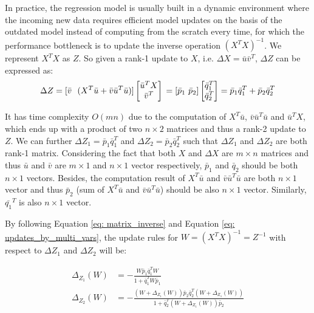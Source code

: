 In practice, the regression model is usually built in a dynamic environment where the incoming new data requires efficient model updates on the basis of the outdated model instead of computing from the scratch every time, for which the performance bottleneck is to update the inverse operation $(X^TX)^{-1}$. We represent $X^TX$ as $Z$. So given a rank-1 update to $X$, i.e. $\Delta X = \bar{u}\bar{v}^T$, $\Delta Z$ can be expressed as:
\begin{equation}
    \Delta Z = [\bar{v}\ \ (X^T\bar{u} + \bar{v}\bar{u}^T\bar{u})]\begin{bmatrix}
    \bar{u}^T X  \\
    \bar{v}^T  
\end{bmatrix}\\
=[\bar{p}_1\ \bar{p}_2]\begin{bmatrix}
    \bar{q}^T_1  \\
    \bar{q}^T_2  
\end{bmatrix}=\bar{p}_1\bar{q}_1^T + \bar{p}_2\bar{q}_2^T
\end{equation}

It has time complexity $O(mn)$ due to the computation of $X^T\bar{u}$, $\bar{v}\bar{u}^T\bar{u}$ and $\bar{u}^TX$, which ends up with a product of two $n\times 2$ matrices and thus a rank-2 update to $Z$. We can further $\Delta Z_1 = \bar{p}_1\bar{q}_1^T$ and $\Delta Z_2 = \bar{p}_2\bar{q}_2^T$ such that $\Delta Z_1$ and $\Delta Z_2$ are both rank-1 matrix. Considering the fact that both $X$ and $\Delta X$ are $m \times n$ matrices and thus $\bar{u}$ and $\bar{v}$ are $m \times 1$ and $n \times 1$ vector respectively, $\bar{p}_1$ and $\bar{q}_2$ should be both $n \times 1$ vectors. Besides, the computation result of $X^T\bar{u}$ and $\bar{v}\bar{u}^T\bar{u}$ are both $n \times 1$ vector and thus $\bar{p}_2$ (sum of $X^T\bar{u}$ and $\bar{v}\bar{u}^T\bar{u}$) should be also $n \times 1$ vector. Similarly, $\bar{q_1}^T$ is also $n \times 1$ vector.

By following Equation \ref{eq: matrix_inverse} and Equation \ref{eq: updates_by_multi_vars}, the update rules for $W = (X^TX)^{-1} = Z^{-1}$ with respect to $\Delta Z_1$ and $\Delta Z_2$ will be:

\begin{center}
\begin{equation}
\begin{split}
    \Delta_{Z_1}(W)& = -\frac{W\bar{p}_1\bar{q}_1^TW}{1 + \bar{q}_1^TW\bar{p}_1}\\
    \Delta_{Z_2}(W)& = -\frac{(W+\Delta_{Z_1}(W))\bar{p}_2\bar{q}_2^T(W+\Delta_{Z_1}(W))}{1 + \bar{q}_2^T(W+\Delta_{Z_1}(W))\bar{p}_2}
\end{split}   
\end{equation}
\end{center}

